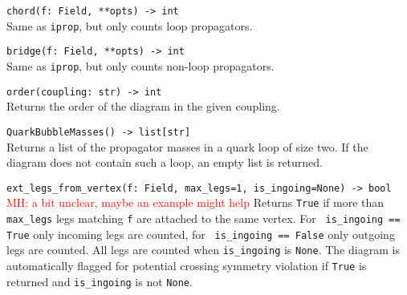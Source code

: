 \begin{basedescript}{\desclabelstyle{\pushlabel}}
   \item[\hspace{-1em}]\colorbox{gray!30}{\lstinline[style=pykw]|chord(f: Field, **opts) -> int|} \vspace{0.1cm}\\
   Same as \texttt{iprop}, but only counts loop propagators.

   \item[\hspace{-1em}]\colorbox{gray!30}{\lstinline[style=pykw]|bridge(f: Field, **opts) -> int|} \vspace{0.1cm}\\
   Same as \texttt{iprop}, but only counts non-loop propagators.

   \item[\hspace{-1em}]\colorbox{gray!30}{\lstinline[style=pykw]|order(coupling: str) -> int|} \vspace{0.1cm}\\
   Returns the order of the diagram in the given coupling.

   \item[\hspace{-1em}]\colorbox{gray!30}{\lstinline[style=pykw]|QuarkBubbleMasses() -> list[str]|} \vspace{0.1cm}\\
   Returns a list of the propagator masses in a quark loop of size two. If the diagram does not contain such a loop, an empty list is returned.  

   \item[\hspace{-1em}]\colorbox{gray!30}{\lstinline[style=pykw]{ext_legs_from_vertex(f: Field, max_legs=1, is_ingoing=None) -> bool}} \vspace{0.1cm}\\
   \textcolor{red}{MH: a bit unclear, maybe an example might help}
   Returns \texttt{True} if more than \texttt{max\_legs} legs matching \texttt{f} are attached to the same vertex. For \lstinline[style=pykw]| is_ingoing == True| only incoming legs are counted, for \lstinline[style=pykw]| is_ingoing == False| only outgoing legs are counted. All legs are counted when \texttt{is\_ingoing} is \texttt{None}. The diagram is automatically flagged for potential crossing symmetry violation if \texttt{True} is returned and \texttt{is\_ingoing} is not \texttt{None}.


\end{basedescript}
